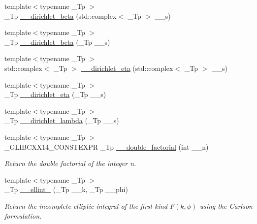 \begin{DoxyCompactItemize}
{\footnotesize template$<$typename \+\_\+\+Tp $>$ }\\\+\_\+\+Tp \hyperlink{namespacestd_1_1____detail_ad0c8e975438d30cbfb5cad91f3ac6d01}{\+\_\+\+\_\+dirichlet\+\_\+beta} (std\+::complex$<$ \+\_\+\+Tp $>$ \+\_\+\+\_\+s)
\item 
{\footnotesize template$<$typename \+\_\+\+Tp $>$ }\\\+\_\+\+Tp \hyperlink{namespacestd_1_1____detail_a2e4243f8d092d48e16fc45ba0c4e9489}{\+\_\+\+\_\+dirichlet\+\_\+beta} (\+\_\+\+Tp \+\_\+\+\_\+s)
\item 
{\footnotesize template$<$typename \+\_\+\+Tp $>$ }\\std\+::complex$<$ \+\_\+\+Tp $>$ \hyperlink{namespacestd_1_1____detail_a3d8d694bf430ca3959c9e6b00c332468}{\+\_\+\+\_\+dirichlet\+\_\+eta} (std\+::complex$<$ \+\_\+\+Tp $>$ \+\_\+\+\_\+s)
\item 
{\footnotesize template$<$typename \+\_\+\+Tp $>$ }\\\+\_\+\+Tp \hyperlink{namespacestd_1_1____detail_a88be5bbcdf85bbc487b6b86b5cb65d98}{\+\_\+\+\_\+dirichlet\+\_\+eta} (\+\_\+\+Tp \+\_\+\+\_\+s)
\item 
{\footnotesize template$<$typename \+\_\+\+Tp $>$ }\\\+\_\+\+Tp \hyperlink{namespacestd_1_1____detail_a6ee8ae93ba65207de8ef3d6bb162b192}{\+\_\+\+\_\+dirichlet\+\_\+lambda} (\+\_\+\+Tp \+\_\+\+\_\+s)
\item 
{\footnotesize template$<$typename \+\_\+\+Tp $>$ }\\\+\_\+\+G\+L\+I\+B\+C\+X\+X14\+\_\+\+C\+O\+N\+S\+T\+E\+X\+PR \+\_\+\+Tp \hyperlink{namespacestd_1_1____detail_a06b0d9786afff0919c96f61d5f760c5f}{\+\_\+\+\_\+double\+\_\+factorial} (int \+\_\+\+\_\+n)
\begin{DoxyCompactList}\small\item\em Return the double factorial of the integer n. \end{DoxyCompactList}\item 
{\footnotesize template$<$typename \+\_\+\+Tp $>$ }\\\+\_\+\+Tp \hyperlink{namespacestd_1_1____detail_aa349fe5bcf36d29cfacf6cd3e8aa65b0}{\+\_\+\+\_\+ellint\+\_} (\+\_\+\+Tp \+\_\+\+\_\+k, \+\_\+\+Tp \+\_\+\+\_\+phi)
\begin{DoxyCompactList}\small\item\em Return the incomplete elliptic integral of the first kind $ F(k,\phi) $ using the Carlson formulation. \end{DoxyCompactList}\item 

\end{DoxyCompactItemize}
